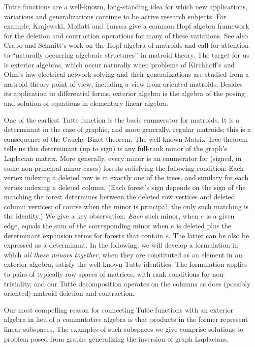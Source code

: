 \documentclass[Unicode]{cedram-alco}
\begin{document}
\noindent

Tutte functions are a well-known, long-standing idea
for which new applications, variations and generalizations
continue to be active research subjects. For example,
Krajewski, Moffatt and Tanasa give a common Hopf algebra framework
for the deletion and contraction operations for many of
these variations\cite{KRAJEWSKI2018271}.
See also Crapo and Schmitt's work
on the Hopf algebra of matroids and call
for attention to ``naturally occurring algebraic
structures'' in matroid theory\cite{CRAPO20051066}.  The target for us
is exterior algebras, which occur naturally when problems of
Kirchhoff's and Ohm's law electrical network solving and their
generalizations are studied from a matroid theory point of view,
including a view from oriented matroids.  Besides its application
to differential forms, exterior algebra is
the algebra of the posing and solution of equations in elementary
linear algebra.

One of the earliest Tutte function is the basis enumerator for matroids. It
is a determinant in the case of graphic, and more generally, regular matroids;
this is a consequence of the Cauchy-Binet theorem.
The well-known Matrix Tree theorem tells us this determinant (up to sign)
is any full-rank minor of the graph's Laplacian matrix. More generally,
every minor is an enumerator for (signed, in some non-principal minor
cases) forests satisfying the following condition: Each vertex indexing
a deleted row is in exactly one of the trees, and similary for each
vertex indexing a deleted column\cite{sdcMTT}. (Each forest's sign depends on the sign of the
matching the forest determines between the deleted row vertices and
deleted column vertices; of course when the minor is principal,
the only such matching is the identity.)
We give a key observation: \emph{Each} such
minor, when $e$ is a given edge, equals the sum of the corresponding
minor when $e$ is deleted plus the determinant expansion terms for
forests that contain $e$.  The latter can be also be expressed as a
determinant.
In the following, we will develop a formulation in which
\emph{all these minors together},
when they are constituted as an element in an exterior algebra, satisfy the
well-known Tutte identities.  The formulation applies to pairs of
typically row-spaces of matrices, with rank conditions for non-triviality,
and our Tutte decomposition operates on the columns as does (possibly oriented)
matroid deletion and contraction.


Our most compelling reason for connecting
Tutte functions with an exterior algebra in lieu of a commutative algebra is that
products in the former represent linear subspaces. The examples of such subspaces
we give comprise solutions to problem posed from graphs generalizing the inversion
of graph Laplacians.  
\end{document}
